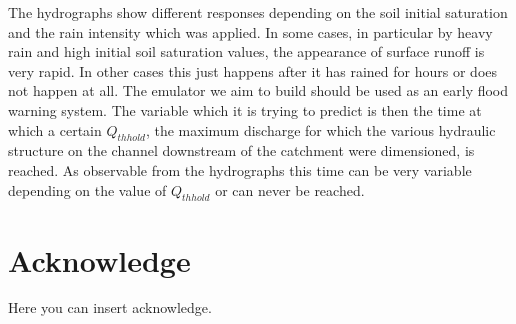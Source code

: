 \documentclass[12pt,a4paper,twocolumn,fleqn]{narms}
\begin{document}
The hydrographs show different responses depending on
the soil initial saturation and the rain intensity which was applied.
In some cases, in particular by heavy rain and high initial soil
saturation values, the appearance of surface runoff is very rapid.
In other cases this just happens after it has rained for hours or
does not happen at all. The emulator we aim to build should be used as
an early flood warning system. The variable which it is trying to predict is
then the time at which a certain $Q_{thhold}$, the maximum discharge for which the
various hydraulic structure on the channel downstream of the catchment were
dimensioned, is reached. As observable from the hydrographs this time can be
very variable depending on the value of $Q_{thhold}$ or can never be reached.



\section{Acknowledge}

Here you can insert acknowledge.



\end{document}
